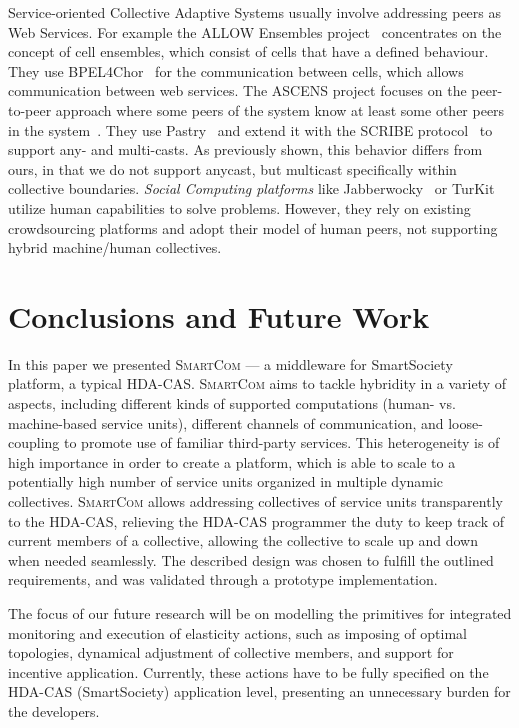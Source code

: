 \documentclass{llncs}
\newcommand{\mdl}{\textsc{SmartCom}}
\begin{document}
  Service-oriented Collective Adaptive Systems usually involve addressing peers as Web Services. For example the ALLOW Ensembles project~\cite{Andrikopoulos} concentrates on the concept of cell ensembles, which consist of cells that have a defined behaviour. They use BPEL4Chor~\cite{BPEL4Chor} for the communication between cells, which allows communication between web services. 
  The ASCENS project focuses on the peer-to-peer approach where some peers of the system know at least some other peers in the system~\cite{AutonomicCloud}. They use Pastry~\cite{Pastry} and extend it with the SCRIBE protocol~\cite{Scribe} to support any- and multi-casts. As previously shown, this behavior differs from ours, in that we do not support anycast, but multicast specifically within collective boundaries.
  \emph{Social Computing platforms} like Jabberwocky~\cite{Jabberwocky} or TurKit~\cite{Turkit} utilize human capabilities to solve problems. However, they rely on existing crowdsourcing platforms and adopt their model of human peers, not supporting hybrid machine/human collectives.


\section{Conclusions and Future Work}
\label{sec:conclusion}

  In this paper we presented \mdl{} --- a middleware for SmartSociety platform, a typical HDA-CAS. \mdl{} aims to tackle hybridity in a variety of aspects, including different kinds of supported computations (human- vs. machine-based service units), different channels of communication, and loose-coupling to promote use of familiar third-party services. This heterogeneity is of high importance in order to create a platform, which is able to scale to a potentially high number of service units organized in multiple dynamic collectives. \mdl{} allows addressing collectives of service units transparently to the HDA-CAS, relieving the HDA-CAS programmer the duty to keep track of current members of a collective, allowing the collective to scale up and down when needed seamlessly. The described design was chosen to fulfill the outlined requirements, and was validated through a prototype implementation. 

  The focus of our future research will be on modelling the primitives for integrated monitoring and execution of elasticity actions, such as imposing of optimal topologies, dynamical adjustment of collective members, and support for incentive application. Currently, these actions have to be fully specified on the HDA-CAS (SmartSociety) application level, presenting an unnecessary burden for the developers.
\end{document}
